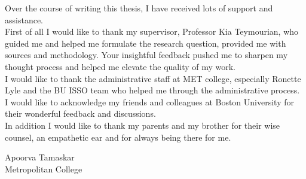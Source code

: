 Over the course of writing this thesis, I have received lots of support and assistance.\\
First of all I would like to thank my supervisor, Professor Kia Teymourian, who guided me and helped me formulate the research question, provided me with sources and methodology. Your insightful feedback pushed me to sharpen my thought process and helped me elevate the quality of my work.\\
I would like to thank the administrative staff at MET college, especially Ronette Lyle and the BU ISSO team who helped me through the administrative process.\\
I would like to acknowledge my friends and colleagues at Boston University for their wonderful feedback and discussions.\\
In addition I would like to thank my parents and my brother for their wise counsel, an empathetic ear and for always being there for me.
\vskip 1in

\noindent
Apoorva Tamaskar\\
Metropolitan College
